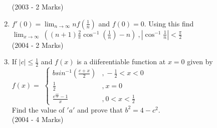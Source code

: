\documentclass[journal,12pt,twocolumn]{IEEEtran}
\theoremstyle{remark}
\begin{document}
\begin{enumerate}
\hfill (2003 - 2 Marks)
\item $f'(0) = \lim_{n \to \infty} nf(\frac{1}{n})$ and $f(0) = 0$. Using this find\\
$\lim_{x \to \infty}\ \left((n+1)\frac{2}{\pi}\cos^{-1}(\frac{1}{n})-n\right)\ , |\cos^{-1}\frac{1}{n}|<\frac{\pi}{2}$\\  
\hfill (2004 - 2 Marks)
\item If $|c| \leq \frac{1}{2}$ and $f(x)$ is a diiferentiable function at $x = 0$ given by\\
$f(x) = $
$\begin{cases}
    bsin^{-1}\left(\frac{c + x}{2}\right) & \text{,}\ -\frac{1}{2}<x<0\\
    \frac{1}{2} & \text{,}\ x=0\\
    \displaystyle \frac{e^\frac{ax}{2} - 1}{x} & \text{,}\ 0<x<\frac{1}{2}
\end{cases}$\\
Find the value of $'a'$ and prove that $b^2 = 4 - c^2$.\\
\hfill (2004 - 4 Marks)






      
\end{enumerate}
\end{document}
